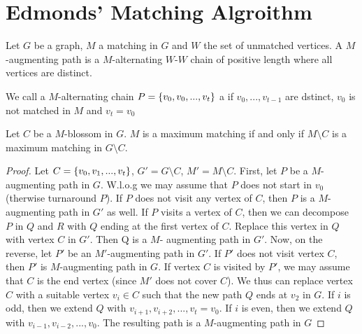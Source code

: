 \begin{lec}[2011-11-21]\end{lec}

\section*{Edmonds' Matching Algroithm}
Let $G$ be a graph, $M$ a matching in $G$ and $W$ the set of unmatched vertices.
A $M$-augmenting path is a $M$-alternating $W$-$W$ chain of positive length 
where all vertices are distinct.

We call a $M$-alternating chain $P=\left\{v_0, v_0, ..., v_t\right\}$ a 
if $v_0, ..., v_{t-1}$ are dstinct, $v_0$ is not matched in $M$ and $v_t = v_0$



\begin{thm}
	Let $C$  be a $M$-blossom in $G$. $M$ is a maximum matching if and only if 
	$M \setminus C$ is a maximum matching in $G \setminus C$.
\end{thm}

\begin{proof}
	Let $C = \left\{v_0, v_1, ..., v_t\right\}$, $G' = G\setminus C$, $M' = M \setminus C$.
	First, let $P$ be a $M$-augmenting path in $G$.
	W.l.o.g we may assume that $P$ does not start in $v_0$ (therwise turnaround
	$P$).
	If $P$ does not visit any vertex of $C$, then $P$ is a $M$-augmenting
	path in $G'$ as well.
	If $P$ visits a vertex of $C$, then we can decompose $P$ in $Q$ and $R$
	with $Q$ ending at the first vertex of $C$.
	Replace this vertex in $Q$ with vertex $C$ in $G'$. Then Q is a $M$-
	augmenting path in $G'$.
	Now, on the reverse, let $P'$ be an $M'$-augmenting path in $G'$.
	If $P'$ does not visit vertex $C$, then $P'$ is $M$-augmenting path in $G$.
	If vertex $C$ is visited by $P'$, we may assume that $C$ is the end
	vertex (since $M'$ does not cover $C$). We thus can replace vertex $C$
	with a suitable vertex $v_i \in C$ such that the new path $Q$ ends at
	$v_2$ in $G$.
	If $i$ is odd, then we extend $Q$ with $v_{i+1}, v_{i+2}, ..., v_t = v_0$.
	If $i$ is even, then we extend $Q$ with $v_{i-1}, v_{i-2}, ..., v_0$.
	The resulting path is a $M$-augmenting path in $G$
\end{proof}
